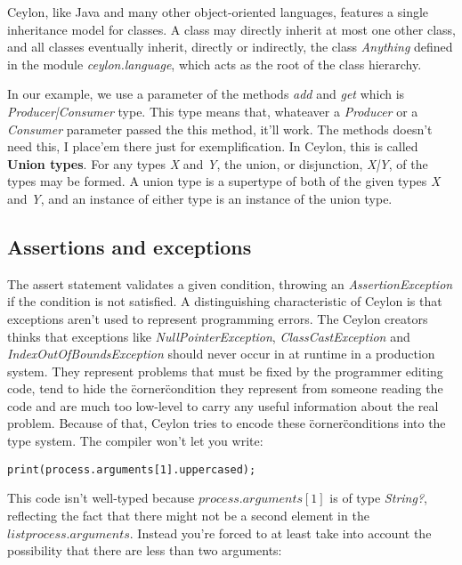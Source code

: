 Ceylon, like Java and many other object-oriented languages, features a single
inheritance model for classes. A class may directly inherit at most one other
class, and all classes eventually inherit, directly or indirectly, the class
\textit{Anything} defined in the module \textit{ceylon.language}, which acts as the root of
the class hierarchy.

In our example, we use a parameter of the methods \textit{add} and  \textit{get} which is
\textit{Producer|Consumer} type. This type means that, whateaver a \textit{Producer} or a
\textit{Consumer} parameter passed the this method, it'll work. The methods doesn't
need this, I place'em there just for exemplification. In Ceylon, this is called
\textbf{Union types}. For any types \textit{X} and \textit{Y}, the union, or disjunction, \textit{X|Y}, of
the types may be formed. A union type is a supertype of both of the given types
\textit{X} and \textit{Y}, and an instance of either type is an instance of the union type.

\subsection{Assertions and exceptions}

The assert statement validates a given condition, throwing an
\textit{AssertionException} if the condition is not satisfied. A distinguishing
characteristic of Ceylon is that exceptions aren't used to represent programming
errors. The Ceylon creators thinks that exceptions like \textit{NullPointerException},
\textit{ClassCastException} and \textit{IndexOutOfBoundsException} should never occur in at
runtime in a production system. They represent problems that must be fixed by
the programmer editing code, tend to hide the \"corner\" condition they represent
from someone reading the code and are much too low-level to carry any useful
information about the real problem. Because of that, Ceylon tries to encode
these \"corner\" conditions into the type system.
The compiler won't let you write:

\begin{lstlisting}[label=cpc,caption=Ceylon Producer-Consumer example]
print(process.arguments[1].uppercased);
\end{lstlisting}

This code isn't well-typed because $process.arguments[1]$ is of type
\textit{String?}, reflecting the fact that there might not be a second element in the
$list process.arguments$. Instead you're forced to at least take into
account the possibility that there are less than two arguments:

